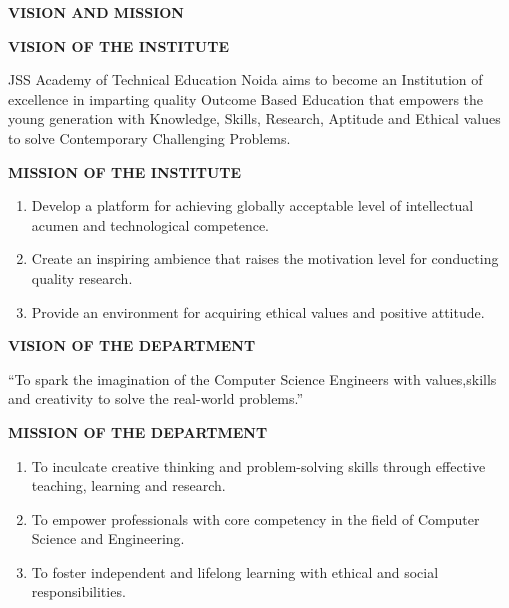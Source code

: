 \providecommand{\normal}{\fontsize{12pt}{16pt}\selectfont}
\providecommand{\size}{\fontsize{14pt}{18pt}\selectfont}
\providecommand{\bigsize}{\fontsize{16pt}{20pt}\selectfont}
\providecommand{\bigbigsize}{\fontsize{20pt}{24pt}\selectfont}
\begin{center}
{\size\textbf{VISION AND MISSION}}
\end{center}
\vspace{5mm}

\noindent\textbf{VISION OF THE INSTITUTE}

\vspace{2mm}
JSS Academy of Technical Education Noida aims to become an Institution of excellence in imparting quality Outcome Based Education that empowers the young generation with Knowledge, Skills, Research, Aptitude and Ethical values to solve Contemporary Challenging Problems.

\vspace{5mm}
\noindent\textbf{MISSION OF THE INSTITUTE}
\begin{enumerate}
    \item Develop a platform for achieving globally acceptable level of intellectual acumen and technological competence.
\item Create an inspiring ambience that raises the motivation level for conducting quality research.
\item Provide an environment for acquiring ethical values and positive attitude.
\end{enumerate}

\vspace{5mm}
\noindent\textbf{VISION OF THE DEPARTMENT}

\vspace{2mm}
“To spark the imagination of the Computer Science Engineers with values,skills and creativity to solve the real-world problems.”

\vspace{5mm}
\noindent\textbf{MISSION OF THE DEPARTMENT}
\begin{enumerate}
    \item To inculcate creative thinking and problem-solving skills through effective teaching, learning and research.
    \item To empower professionals with core competency in the field of Computer Science and Engineering.
   \item  To foster independent and lifelong learning with ethical and social responsibilities.
\end{enumerate}

